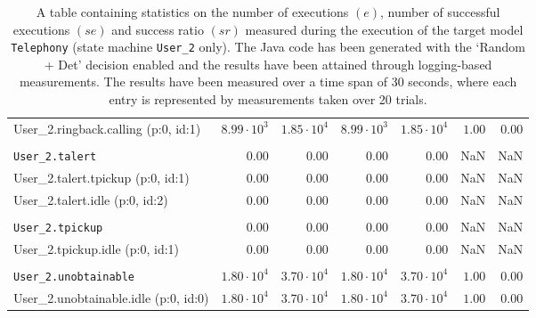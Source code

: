 \begin{table}[htbp]
{\begin{tabular}{lrrrrrr}
\hspace{3mm}User\_2.ringback.calling (p:0, id:1)     & $8.99 \cdot 10^{3}$ & $1.85 \cdot 10^{4}$ & $8.99 \cdot 10^{3}$ & $1.85 \cdot 10^{4}$ &               $1.00$ &               $0.00$ \\
\\[-8pt]\texttt{User\_2.talert}                      &              $0.00$ &              $0.00$ &              $0.00$ &              $0.00$ &                  NaN &                  NaN \\
\hspace{3mm}User\_2.talert.tpickup (p:0, id:1)       &              $0.00$ &              $0.00$ &              $0.00$ &              $0.00$ &                  NaN &                  NaN \\
\hspace{3mm}User\_2.talert.idle (p:0, id:2)          &              $0.00$ &              $0.00$ &              $0.00$ &              $0.00$ &                  NaN &                  NaN \\
\\[-8pt]\texttt{User\_2.tpickup}                     &              $0.00$ &              $0.00$ &              $0.00$ &              $0.00$ &                  NaN &                  NaN \\
\hspace{3mm}User\_2.tpickup.idle (p:0, id:1)         &              $0.00$ &              $0.00$ &              $0.00$ &              $0.00$ &                  NaN &                  NaN \\
\\[-8pt]\texttt{User\_2.unobtainable}                & $1.80 \cdot 10^{4}$ & $3.70 \cdot 10^{4}$ & $1.80 \cdot 10^{4}$ & $3.70 \cdot 10^{4}$ &               $1.00$ &               $0.00$ \\
\hspace{3mm}User\_2.unobtainable.idle (p:0, id:0)    & $1.80 \cdot 10^{4}$ & $3.70 \cdot 10^{4}$ & $1.80 \cdot 10^{4}$ & $3.70 \cdot 10^{4}$ &               $1.00$ &               $0.00$ \\
\bottomrule
\end{tabular}
}
\caption{A table containing statistics on the number of executions $(e)$, number of successful executions $(se)$ and success ratio $(sr)$ measured during the execution of the target model \texttt{Telephony} (state machine \texttt{User\_2} only). The Java code has been generated with the `Random + Det' decision enabled and the results have been attained through logging-based measurements. The results have been measured over a time span of 30 seconds, where each entry is represented by measurements taken over 20 trials.}
\label{table:frequency_results_telephony_logging_user_2}
\end{table}